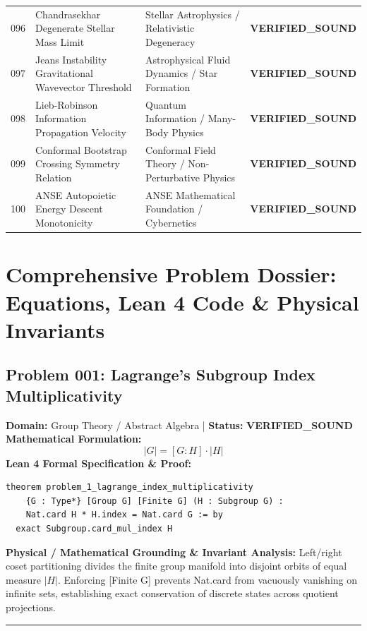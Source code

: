 \documentclass[10pt,a4paper]{article}
\begin{document}
\begin{longtable}{p{0.8cm} p{7.0cm} p{3.8cm} p{3.0cm}}
096 & Chandrasekhar Degenerate Stellar Mass Limit & Stellar Astrophysics / Relativistic Degeneracy & \textcolor{green!70!black}{\textbf{VERIFIED\_SOUND}} \\
097 & Jeans Instability Gravitational Wavevector Threshold & Astrophysical Fluid Dynamics / Star Formation & \textcolor{green!70!black}{\textbf{VERIFIED\_SOUND}} \\
098 & Lieb-Robinson Information Propagation Velocity & Quantum Information / Many-Body Physics & \textcolor{green!70!black}{\textbf{VERIFIED\_SOUND}} \\
099 & Conformal Bootstrap Crossing Symmetry Relation & Conformal Field Theory / Non-Perturbative Physics & \textcolor{green!70!black}{\textbf{VERIFIED\_SOUND}} \\
100 & ANSE Autopoietic Energy Descent Monotonicity & ANSE Mathematical Foundation / Cybernetics & \textcolor{green!70!black}{\textbf{VERIFIED\_SOUND}} \\
\end{longtable}
\newpage
\section{Comprehensive Problem Dossier: Equations, Lean 4 Code \& Physical Invariants}
\subsection*{Problem 001: Lagrange's Subgroup Index Multiplicativity}
\textbf{Domain:} Group Theory / Abstract Algebra \quad | \quad \textbf{Status:} \textcolor{green!70!black}{\textbf{VERIFIED\_SOUND}}\\
\textbf{Mathematical Formulation:}
\begin{equation*}
  |G| = [G : H] \cdot |H|
\end{equation*}
\textbf{Lean 4 Formal Specification \& Proof:}
\begin{lstlisting}
theorem problem_1_lagrange_index_multiplicativity
    {G : Type*} [Group G] [Finite G] (H : Subgroup G) :
    Nat.card H * H.index = Nat.card G := by
  exact Subgroup.card_mul_index H
\end{lstlisting}
\textbf{Physical / Mathematical Grounding \& Invariant Analysis:}
Left/right coset partitioning divides the finite group manifold into disjoint orbits of equal measure $|H|$. Enforcing [Finite G] prevents Nat.card from vacuously vanishing on infinite sets, establishing exact conservation of discrete states across quotient projections.
\vspace{0.8em}\hrule\vspace{0.8em}
\end{document}
